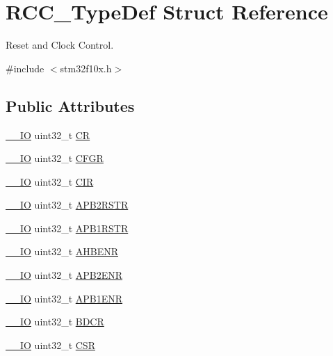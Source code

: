 \hypertarget{struct_r_c_c___type_def}{}\section{R\+C\+C\+\_\+\+Type\+Def Struct Reference}
\label{struct_r_c_c___type_def}


Reset and Clock Control.  




{\ttfamily \#include $<$stm32f10x.\+h$>$}

\subsection*{Public Attributes}
\begin{DoxyCompactItemize}
\item 
\hyperlink{core__sc300_8h_aec43007d9998a0a0e01faede4133d6be}{\+\_\+\+\_\+\+IO} uint32\+\_\+t \hyperlink{struct_r_c_c___type_def_abcb9ff48b9afb990283fefad0554b5b3}{CR}
\item 
\hyperlink{core__sc300_8h_aec43007d9998a0a0e01faede4133d6be}{\+\_\+\+\_\+\+IO} uint32\+\_\+t \hyperlink{struct_r_c_c___type_def_a0721b1b729c313211126709559fad371}{C\+F\+GR}
\item 
\hyperlink{core__sc300_8h_aec43007d9998a0a0e01faede4133d6be}{\+\_\+\+\_\+\+IO} uint32\+\_\+t \hyperlink{struct_r_c_c___type_def_aeadf3a69dd5795db4638f71938704ff0}{C\+IR}
\item 
\hyperlink{core__sc300_8h_aec43007d9998a0a0e01faede4133d6be}{\+\_\+\+\_\+\+IO} uint32\+\_\+t \hyperlink{struct_r_c_c___type_def_a4491ab20a44b70bf7abd247791676a59}{A\+P\+B2\+R\+S\+TR}
\item 
\hyperlink{core__sc300_8h_aec43007d9998a0a0e01faede4133d6be}{\+\_\+\+\_\+\+IO} uint32\+\_\+t \hyperlink{struct_r_c_c___type_def_a600f4d6d592f43edb2fc653c5cba023a}{A\+P\+B1\+R\+S\+TR}
\item 
\hyperlink{core__sc300_8h_aec43007d9998a0a0e01faede4133d6be}{\+\_\+\+\_\+\+IO} uint32\+\_\+t \hyperlink{struct_r_c_c___type_def_abaebc9204bbc1708356435a5a01e70eb}{A\+H\+B\+E\+NR}
\item 
\hyperlink{core__sc300_8h_aec43007d9998a0a0e01faede4133d6be}{\+\_\+\+\_\+\+IO} uint32\+\_\+t \hyperlink{struct_r_c_c___type_def_a619b4c22f630a269dfd0c331f90f6868}{A\+P\+B2\+E\+NR}
\item 
\hyperlink{core__sc300_8h_aec43007d9998a0a0e01faede4133d6be}{\+\_\+\+\_\+\+IO} uint32\+\_\+t \hyperlink{struct_r_c_c___type_def_aec7622ba90341c9faf843d9ee54a759f}{A\+P\+B1\+E\+NR}
\item 
\hyperlink{core__sc300_8h_aec43007d9998a0a0e01faede4133d6be}{\+\_\+\+\_\+\+IO} uint32\+\_\+t \hyperlink{struct_r_c_c___type_def_a05be375db50e8c9dd24fb3bcf42d7cf1}{B\+D\+CR}
\item 
\hyperlink{core__sc300_8h_aec43007d9998a0a0e01faede4133d6be}{\+\_\+\+\_\+\+IO} uint32\+\_\+t \hyperlink{struct_r_c_c___type_def_a7e913b8bf59d4351e1f3d19387bd05b9}{C\+SR}
\end{DoxyCompactItemize}


